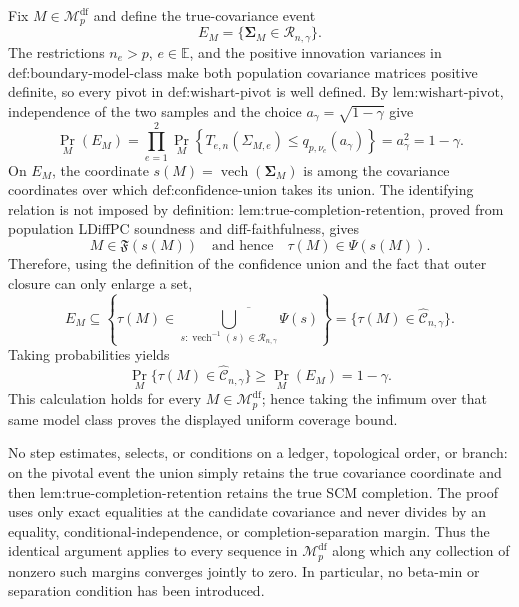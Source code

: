 Fix \(M\in\mathcal M_p^{\mathrm{df}}\) and define the true-covariance event
\[
E_M=\{\boldsymbol\Sigma_M\in\mathcal R_{n,\gamma}\}.
\]
The restrictions \(n_e>p\), \(e\in\mathbb E\), and the positive innovation variances in \(\text{def:boundary-model-class}\) make both population covariance matrices positive definite, so every pivot in \(\text{def:wishart-pivot}\) is well defined.  By \(\text{lem:wishart-pivot}\), independence of the two samples and the choice \(a_\gamma=\sqrt{1-\gamma}\) give
\[
\Pr_M(E_M)
=\prod_{e=1}^2
  \Pr_M\!\left\{T_{e,n}(\Sigma_{M,e})
       \le q_{p,\nu_e}(a_\gamma)\right\}
=a_\gamma^2
=1-\gamma.
\]
On \(E_M\), the coordinate \(s(M)=\operatorname{vech}(\boldsymbol\Sigma_M)\) is among the covariance coordinates over which \(\text{def:confidence-union}\) takes its union.  The identifying relation is not imposed by definition: \(\text{lem:true-completion-retention}\), proved from population LDiffPC soundness and diff-faithfulness, gives
\[
M\in\mathfrak F(s(M))
\quad\text{and hence}\quad
\tau(M)\in\Psi(s(M)).
\]
Therefore, using the definition of the confidence union and the fact that outer closure can only enlarge a set,
\[
E_M
\subseteq
\left\{\tau(M)\in
\overline{\bigcup_{s:\operatorname{vech}^{-1}(s)\in
\mathcal R_{n,\gamma}}\Psi(s)}\right\}
=\{\tau(M)\in\widehat{\mathcal C}_{n,\gamma}\}.
\]
Taking probabilities yields
\[
\Pr_M\{\tau(M)\in\widehat{\mathcal C}_{n,\gamma}\}
\ge \Pr_M(E_M)=1-\gamma.
\]
This calculation holds for every \(M\in\mathcal M_p^{\mathrm{df}}\); hence taking the infimum over that same model class proves the displayed uniform coverage bound.

No step estimates, selects, or conditions on a ledger, topological order, or branch: on the pivotal event the union simply retains the true covariance coordinate and then \(\text{lem:true-completion-retention}\) retains the true SCM completion.  The proof uses only exact equalities at the candidate covariance and never divides by an equality, conditional-independence, or completion-separation margin.  Thus the identical argument applies to every sequence in \(\mathcal M_p^{\mathrm{df}}\) along which any collection of nonzero such margins converges jointly to zero.  In particular, no beta-min or separation condition has been introduced.